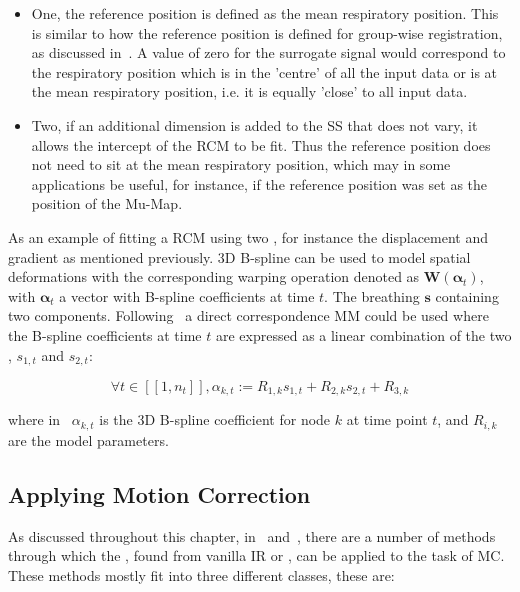                 \begin{itemize}
                    \item One, the reference position is defined as the mean respiratory position. This is similar to how the reference position is defined for group-wise registration, as discussed in~. A value of zero for the surrogate signal would correspond to the respiratory position which is in the 'centre' of all the input data or is at the mean respiratory position, i.e. it is equally 'close' to all input data.
                    
                    \item Two, if an additional dimension is added to the \gls{SS} that does not vary, it allows the intercept of the \gls{RCM} to be fit. Thus the reference position does not need to sit at the mean respiratory position, which may in some applications be useful, for instance, if the reference position was set as the position of the \gls{Mu-Map}.
                \end{itemize}
                
                As an example of fitting a \gls{RCM} using two , for instance the displacement and gradient as mentioned previously. \gls{3D} B-spline can be used to model spatial deformations with the corresponding warping operation denoted as $\mathbf{W}(\mathbf{\alpha}_t)$, with $\mathbf{\alpha}_t$ a vector with B-spline coefficients at time $t$. The breathing  $\mathbf{s}$ containing two components. Following~\parencite{McClelland2017} a direct correspondence \gls{MM} could be used where the B-spline coefficients at time $t$ are expressed as a linear combination of the two , $s_{1,t}$ and $s_{2,t}$:
            
                \begin{equation}\label{eq:respiratory_correspondence_model_motion_parameters}
                    \forall t \in [[1, n_t]], \alpha_{k, t} := R_{1, k} s_{1, t} + R_{2, k} s_{2, t} + R_{3, k}
                \end{equation}
                
                \noindent where in~ $\alpha_{k,t}$ is the \gls{3D} B-spline coefficient for node $k$ at time point $t$, and $R_{i,k}$ are the model parameters.
        
        \subsection{Applying Motion Correction} \label{sec:applying_motion_correction}
            As discussed throughout this chapter, in~ and~, there are a number of methods through which the , found from vanilla \gls{IR} or , can be applied to the task of \gls{MC}. These methods mostly fit into three different classes, these are:
            

